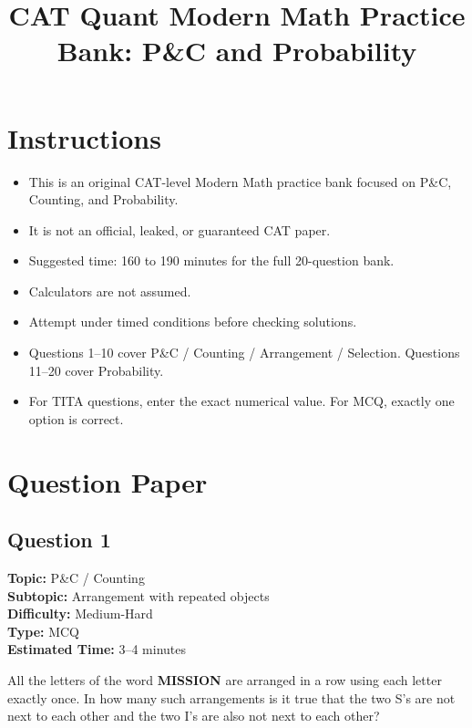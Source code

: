 \documentclass[11pt]{article}
\title{\textbf{CAT Quant Modern Math Practice Bank: P\&C and Probability}}
\author{}
\date{}
\begin{document}
\maketitle

\section*{Instructions}

\begin{itemize}
\item This is an original CAT-level Modern Math practice bank focused on P\&C, Counting, and Probability.
\item It is not an official, leaked, or guaranteed CAT paper.
\item Suggested time: 160 to 190 minutes for the full 20-question bank.
\item Calculators are not assumed.
\item Attempt under timed conditions before checking solutions.
\item Questions 1--10 cover P\&C / Counting / Arrangement / Selection. Questions 11--20 cover Probability.
\item For TITA questions, enter the exact numerical value. For MCQ, exactly one option is correct.
\end{itemize}

\newpage

\section*{Question Paper}

\subsection*{Question 1}
\textbf{Topic:} P\&C / Counting \\
\textbf{Subtopic:} Arrangement with repeated objects \\
\textbf{Difficulty:} Medium-Hard \\
\textbf{Type:} MCQ \\
\textbf{Estimated Time:} 3--4 minutes

\begin{tcolorbox}
All the letters of the word \textbf{MISSION} are arranged in a row using each letter exactly once. In how many such arrangements is it true that the two S's are not next to each other and the two I's are also not next to each other?
\end{tcolorbox}
\end{document}
